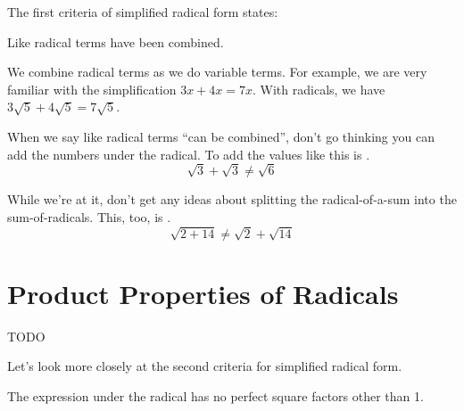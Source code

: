 The first criteria of simplified radical form states:

\begin{boxedcriteria}
Like radical terms have been combined.
\end{boxedcriteria}

We combine radical terms as we do variable terms. For example, we are very familiar with the simplification $3x+4x = 7x$. With radicals, we have $3\sqrt{5}+4\sqrt{5} = 7\sqrt{5}$.

\begin{boxedwarning}
When we say like radical terms ``can be combined'', don't go thinking you can add the numbers under the radical. To add the values like this is \evilandwrong.
\[ \sqrt{3} + \sqrt{3} \neq \sqrt{6}\]

While we're at it, don't get any ideas about splitting the radical-of-a-sum into the sum-of-radicals. This, too, is \evilandwrong.
\[\sqrt{2+14} \neq \sqrt{2} +\sqrt{14}\]
\end{boxedwarning}

%
%

\section{Product Properties of Radicals}
\label{sec:radproduct}

\begin{boxedexplore}
TODO
\end{boxedexplore}


Let's look more closely at the second criteria for simplified radical form.

\begin{boxedcriteria}
The expression under the radical has no perfect square factors other than 1.
\end{boxedcriteria}

